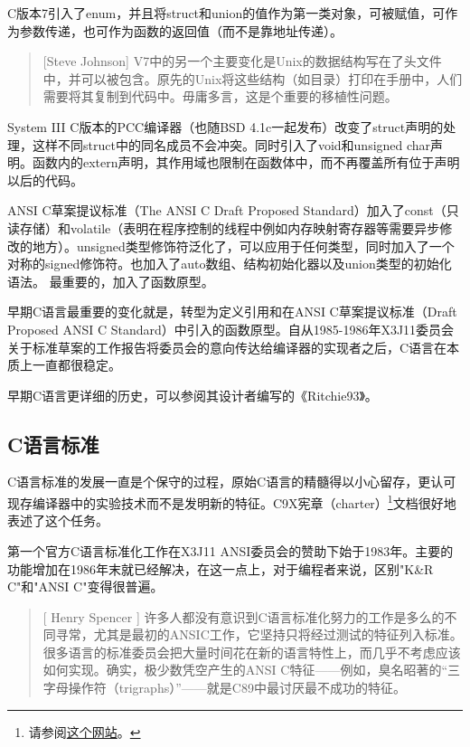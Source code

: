 \documentclass[12pt,oneside]{book}
\begin{document}
\begin{common-format}
C版本7引入了enum，并且将struct和union的值作为第一类对象，可被赋值，可作为参数传递，也可作为函数的返回值（而不是靠地址传递）。

\begin{quote}[Steve Johnson]
V7中的另一个主要变化是Unix的数据结构写在了头文件中，并可以被包含。原先的Unix将这些结构（如目录）打印在手册中，人们需要将其复制到代码中。毋庸多言，这是个重要的移植性问题。
\end{quote}

System III C版本的PCC编译器（也随BSD 4.1c一起发布）改变了struct声明的处理，这样不同struct中的同名成员不会冲突。同时引入了void和unsigned char声明。函数内的extern声明，其作用域也限制在函数体中，而不再覆盖所有位于声明以后的代码。

ANSI C草案提议标准（The ANSI C Draft Proposed Standard）加入了const（只读存储）和volatile（表明在程序控制的线程中例如内存映射寄存器等需要异步修改的地方）。unsigned类型修饰符泛化了，可以应用于任何类型，同时加入了一个对称的signed修饰符。也加入了auto数组、结构初始化器以及union类型的初始化语法。
最重要的，加入了函数原型。

早期C语言最重要的变化就是，转型为定义引用和在ANSI C草案提议标准（Draft Proposed ANSI C Standard）中引入的函数原型。自从1985-1986年X3J11委员会关于标准草案的工作报告将委员会的意向传达给编译器的实现者之后，C语言在本质上一直都很稳定。

早期C语言更详细的历史，可以参阅其设计者编写的《Ritchie93》。

\subsection{C语言标准}
C语言标准的发展一直是个保守的过程，原始C语言的精髓得以小心留存，更认可现存编译器中的实验技术而不是发明新的特征。C9X宪章（charter）\footnote{请参阅\href{http://anubis.dkuug.dk/JTC1/SC22/WG14/www/charter}{这个网站}。}文档很好地表述了这个任务。

第一个官方C语言标准化工作在X3J11 ANSI委员会的赞助下始于1983年。主要的功能增加在1986年末就已经解决，在这一点上，对于编程者来说，区别"K\&{}R C"和"ANSI C"变得很普遍。

\begin{quote}[ Henry Spencer 	]
许多人都没有意识到C语言标准化努力的工作是多么的不同寻常，尤其是最初的ANSIC工作，它坚持只将经过测试的特征列入标准。很多语言的标准委员会把大量时间花在新的语言特性上，而几乎不考虑应该如何实现。确实，极少数凭空产生的ANSI C特征——例如，臭名昭著的“三字母操作符（trigraphs）”——就是C89中最讨厌最不成功的特征。
\end{quote}


\end{common-format}
\end{document}
